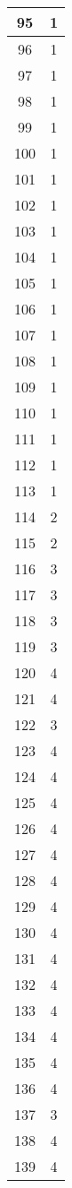\documentclass[letterpaper, 12pt]{article}
\begin{document}
\begin{longtable}{|c|c|}
\hline
95 & 1 \\
\hline
96 & 1 \\
\hline
97 & 1 \\
\hline
98 & 1 \\
\hline
99 & 1 \\
\hline
100 & 1 \\
\hline
101 & 1 \\
\hline
102 & 1 \\
\hline
103 & 1 \\
\hline
104 & 1 \\
\hline
105 & 1 \\
\hline
106 & 1 \\
\hline
107 & 1 \\
\hline
108 & 1 \\
\hline
109 & 1 \\
\hline
110 & 1 \\
\hline
111 & 1 \\
\hline
112 & 1 \\
\hline
113 & 1 \\
\hline
114 & 2 \\
\hline
115 & 2 \\
\hline
116 & 3 \\
\hline
117 & 3 \\
\hline
118 & 3 \\
\hline
119 & 3 \\
\hline
120 & 4 \\
\hline
121 & 4 \\
\hline
122 & 3 \\
\hline
123 & 4 \\
\hline
124 & 4 \\
\hline
125 & 4 \\
\hline
126 & 4 \\
\hline
127 & 4 \\
\hline
128 & 4 \\
\hline
129 & 4 \\
\hline
130 & 4 \\
\hline
131 & 4 \\
\hline
132 & 4 \\
\hline
133 & 4 \\
\hline
134 & 4 \\
\hline
135 & 4 \\
\hline
136 & 4 \\
\hline
137 & 3 \\
\hline
138 & 4 \\
\hline
139 & 4 \\

\end{longtable}
\end{document}
